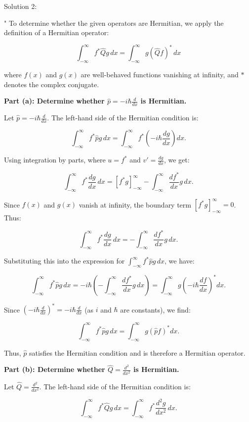 Solution 2:

"
To determine whether the given operators are Hermitian, we apply the definition of a Hermitian operator:

\[
\int_{-\infty}^\infty f^* \hat{Q} g \, dx = \int_{-\infty}^\infty g (\hat{Q} f)^* \, dx
\]

where $f(x)$ and $g(x)$ are well-behaved functions vanishing at infinity, and $*$ denotes the complex conjugate.

\textbf{Part (a): Determine whether $\hat{p} = -i\hbar \frac{d}{dx}$ is Hermitian.}

Let $\hat{p} = -i\hbar \frac{d}{dx}$. The left-hand side of the Hermitian condition is:

\[
\int_{-\infty}^\infty f^* \hat{p} g \, dx = \int_{-\infty}^\infty f^* \left(-i\hbar \frac{d g}{dx}\right) dx.
\]

Using integration by parts, where $u = f^*$ and $v' = \frac{dg}{dx}$, we get:

\[
\int_{-\infty}^\infty f^* \frac{d g}{dx} \, dx = \left[ f^* g \right]_{-\infty}^\infty - \int_{-\infty}^\infty \frac{d f^*}{dx} g \, dx.
\]

Since $f(x)$ and $g(x)$ vanish at infinity, the boundary term $\left[ f^* g \right]_{-\infty}^\infty = 0$. Thus:

\[
\int_{-\infty}^\infty f^* \frac{d g}{dx} \, dx = - \int_{-\infty}^\infty \frac{d f^*}{dx} g \, dx.
\]

Substituting this into the expression for $\int_{-\infty}^\infty f^* \hat{p} g \, dx$, we have:

\[
\int_{-\infty}^\infty f^* \hat{p} g \, dx = -i\hbar \left(- \int_{-\infty}^\infty \frac{d f^*}{dx} g \, dx \right) = \int_{-\infty}^\infty g \left(-i\hbar \frac{d f}{dx}\right)^* dx.
\]

Since $(-i\hbar \frac{d}{dx})^* = -i\hbar \frac{d}{dx}$ (as $i$ and $\hbar$ are constants), we find:

\[
\int_{-\infty}^\infty f^* \hat{p} g \, dx = \int_{-\infty}^\infty g (\hat{p} f)^* dx.
\]

Thus, $\hat{p}$ satisfies the Hermitian condition and is therefore a Hermitian operator. 

\textbf{Part (b): Determine whether $\hat{Q} = \frac{d^2}{dx^2}$ is Hermitian.}

Let $\hat{Q} = \frac{d^2}{dx^2}$. The left-hand side of the Hermitian condition is:

\[
\int_{-\infty}^\infty f^* \hat{Q} g \, dx = \int_{-\infty}^\infty f^* \frac{d^2 g}{dx^2} \, dx.
\]

